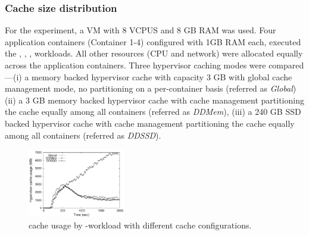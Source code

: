 \subsubsection{Cache size distribution}
For the experiment, a VM with 8 VCPUS and 8 GB RAM was used.
%
Four application containers (Container 1-4)  configured with 1GB RAM each,
executed the \web, \proxy, \mail, \video{} workloads.
%
All other resources (CPU and network) were allocated equally
across the application containers.  
%
Three hypervisor caching modes were compared---(i) a memory backed hypervisor cache 
with capacity 3 GB with global cache management mode, no
partitioning on a per-container basis (referred as \emph{Global}) %
(ii) a 3 GB memory backed hypervisor cache with 
\dd{} cache management partitioning the cache equally among all containers
(referred as \emph{DDMem}),
(iii) a 240 GB SSD backed hypervisor cache with 
\dd{} cache management partitioning the cache equally among all containers
(referred as \emph{DDSSD}).
% 

\begin{figure}[t]
  \centering
\includegraphics[width=0.38\textwidth]{data/correctness/only_video}
 \caption{\dd{} cache usage by \video-workload with different cache
          configurations.}
 \vspace{-0.5cm}
 \label{fig:video}
\end{figure} 



